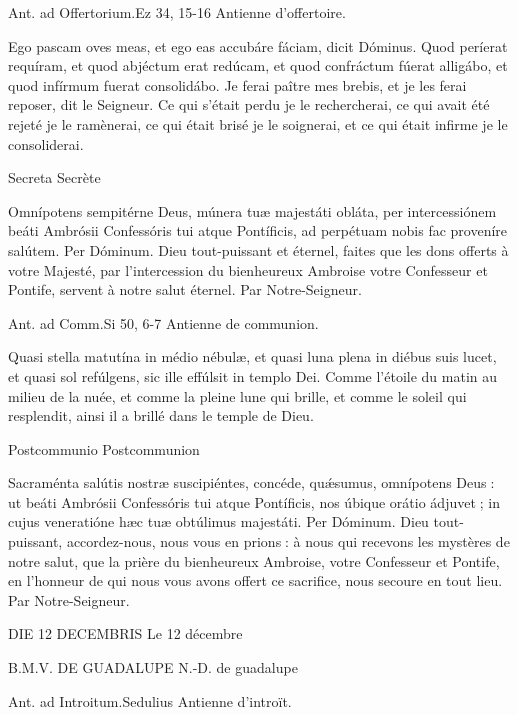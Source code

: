 \begin{paracol}{2}
Ant. ad Offertorium.\hfill Ez 34, 15-16
\switchcolumn
Antienne d’offertoire.
\switchcolumn*

Ego pascam oves meas, et ego eas accubáre fáciam, dicit Dóminus. Quod períerat requíram, et quod abjéctum erat redúcam, et quod confráctum fúerat alligábo, et quod infírmum fuerat consolidábo.
\switchcolumn
Je ferai paître mes brebis, et je les ferai reposer, dit le Seigneur. Ce qui s’était perdu je le rechercherai, ce qui avait été rejeté je le ramènerai, ce qui était brisé je le soignerai, et ce qui était infirme je le consoliderai.
\switchcolumn*

Secreta
\switchcolumn
Secrète
\switchcolumn*

Omnípotens sempitérne Deus,  múnera tuæ majestáti obláta, per intercessiónem beáti Ambrósii Confessóris tui atque Pontíficis, ad perpétuam nobis fac proveníre salútem. Per Dóminum.
\switchcolumn
Dieu tout-puissant et éternel, faites que les dons offerts à votre Majesté, par l’intercession du bienheureux Ambroise votre Confesseur et Pontife, servent à notre salut éternel. Par Notre-Seigneur.
\switchcolumn*

Ant. ad Comm.\hfill Si 50, 6-7
\switchcolumn
Antienne de communion.
\switchcolumn*

Quasi stella matutína in médio nébulæ, et quasi luna plena in diébus suis lucet, et quasi sol refúlgens, sic ille effúlsit in templo Dei.
\switchcolumn
Comme l’étoile du matin au milieu de la nuée, et comme la pleine lune  qui brille, et comme le soleil qui resplendit, ainsi il a brillé dans le temple de Dieu.
\switchcolumn*

Postcommunio
\switchcolumn
Postcommunion
\switchcolumn*

Sacraménta salútis nostræ suscipiéntes, concéde, quǽsumus, omnípotens Deus : ut beáti Ambrósii Confessóris tui atque Pontíficis, nos úbique orátio ádjuvet ; in cujus veneratióne hæc tuæ obtúlimus majestáti. Per Dóminum.
\switchcolumn
Dieu tout-puissant, accordez-nous,  nous vous en prions : à nous qui recevons les mystères de notre salut, que la prière du bienheureux Ambroise, votre Confesseur et Pontife, en l’honneur de qui nous vous avons offert ce sacrifice, nous secoure en tout lieu. Par Notre-Seigneur.
\switchcolumn*

DIE 12 DECEMBRIS
\switchcolumn
Le 12 décembre
\switchcolumn*

B.M.V. DE GUADALUPE
\switchcolumn
N.-D. de guadalupe
\switchcolumn*

Ant. ad Introitum.\hfill Sedulius
\switchcolumn
Antienne d’introït.
\switchcolumn*


\end{paracol}
